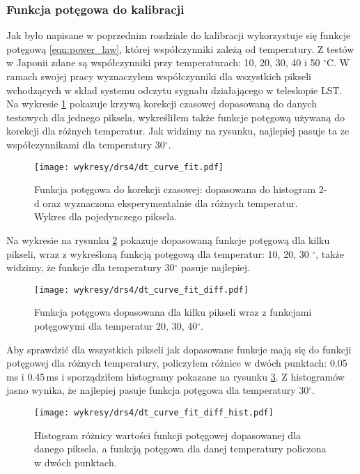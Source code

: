 \documentclass[a4paper,11pt,twoside]{article}
\begin{document}
\subsubsection{Funkcja potęgowa do kalibracji}
Jak było napisane w poprzednim rozdziale do kalibracji wykorzystuje się funkcje potęgową \ref{eqn:power_law}, której współczynniki zależą od temperatury. Z testów w Japonii zdane są współczynniki przy temperaturach: 10, 20, 30, 40 i 50 $^\circ$C. W ramach swojej pracy wyznaczyłem  współczynniki dla wszystkich pikseli wchodzących w skład systemu odczytu sygnału działającego w teleskopie LST. Na wykresie \ref{fig:dt_curve_fit_all_temp} pokazuje krzywą korekcji czasowej dopasowaną do danych testowych dla jednego piksela, wykreśliłem także funkcje potęgową używaną do korekcji dla różnych temperatur. Jak widzimy na rysunku, najlepiej pasuje ta ze współczynnikami dla temperatury 30$^{\circ}$. 
\begin{figure}[H] 
\centering
\texttt{[image: wykresy/drs4/dt\_curve\_fit.pdf]}
\caption{Funkcja potęgowa do korekcji czasowej: dopasowana do histogram 2-d oraz wyznaczona eksperymentalnie dla różnych temperatur. Wykres dla  pojedynczego piksela.}
\label{fig:dt_curve_fit_all_temp}
\end{figure}
Na wykresie na rysunku \ref{fig:dt_curve_fit_few_pixels} pokazuje dopasowaną funkcje potęgową dla kilku pikseli, wraz z wykreśloną funkcją potęgową dla temperatur: 10, 20, 30 $^{\circ}$, także widzimy, że funkcje dla temperatury 30$^{\circ}$ pasuje najlepiej.
\begin{figure}[H] 
\centering
\texttt{[image: wykresy/drs4/dt\_curve\_fit\_diff.pdf]}
\caption{Funkcja potęgowa dopasowana dla kilku pikseli wraz z funkcjami potęgowymi dla temperatur 20, 30, 40$^{\circ}$.}
\label{fig:dt_curve_fit_few_pixels}
\end{figure}
Aby sprawdzić dla wszystkich pikseli jak dopasowane funkcje mają się do funkcji potęgowej dla różnych temperatury, policzyłem różnice w dwóch punktach: 0.05\,ms i 0.45\,ms i sporządziłem histogramy pokazane na rysunku \ref{fig:dt_curve_hist}. Z histogramów jasno wynika, że najlepiej pasuje funkcja potęgowa dla temperatury 30$^{\circ}$.
\begin{figure}[H] 
\centering
\texttt{[image: wykresy/drs4/dt\_curve\_fit\_diff\_hist.pdf]}
\caption{Histogram różnicy wartości funkcji potęgowej dopasowanej dla danego piksela, a funkcją potęgowa dla danej temperatury policzona w dwóch punktach.}
\label{fig:dt_curve_hist}
\end{figure}
\end{document}
